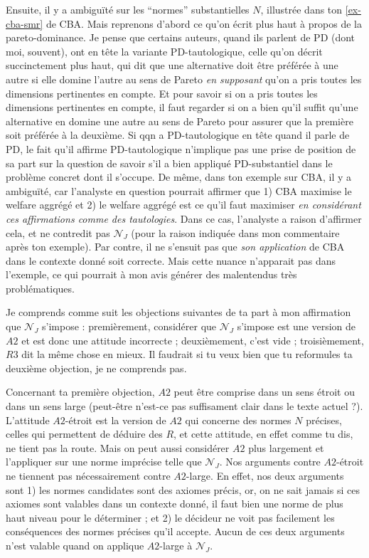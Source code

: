 \documentclass[preprint, french, english, 11pt, authoryear]{elsarticle}%
\newcommand{\fadv}{\mathscr{N}_J}%
\begin{document}
Ensuite, il y a ambiguïté sur les “normes” substantielles $N$, illustrée dans ton \cref{ex-cba-smr} de CBA. Mais reprenons d’abord ce qu’on écrit plus haut à propos de la pareto-dominance. Je pense que certains auteurs, quand ils parlent de PD (dont moi, souvent), ont en tête la variante PD-tautologique, celle qu’on décrit succinctement plus haut, qui dit que une alternative doit être préférée à une autre si elle domine l’autre au sens de Pareto \emph{en supposant} qu’on a pris toutes les dimensions pertinentes en compte. Et pour savoir si on a pris toutes les dimensions pertinentes en compte, il faut regarder si on a bien qu’il suffit qu’une alternative en domine une autre au sens de Pareto pour assurer que la première soit préférée à la deuxième. Si qqn a PD-tautologique en tête quand il parle de PD, le fait qu’il affirme PD-tautologique n’implique pas une prise de position de sa part sur la question de savoir s’il a bien appliqué PD-substantiel dans le problème concret dont il s’occupe. De même, dans ton exemple sur CBA, il y a ambiguïté, car l’analyste en question pourrait affirmer que 1) CBA maximise le welfare aggrégé et 2) le welfare aggrégé est ce qu’il faut maximiser \emph{en considérant ces affirmations comme des tautologies}. Dans ce cas, l’analyste a raison d’affirmer cela, et ne contredit pas $\fadv$ (pour la raison indiquée dans mon commentaire après ton exemple). Par contre, il ne s’ensuit pas que \emph{son application} de CBA dans le contexte donné soit correcte. Mais cette nuance n’apparait pas dans l’exemple, ce qui pourrait à mon avis générer des malentendus très problématiques.

Je comprends comme suit les objections suivantes de ta part à mon affirmation que $\fadv$ s’impose : premièrement, considérer que $\fadv$ s’impose est une version de $A2$ et est donc une attitude incorrecte ; deuxièmement, c’est vide ; troisièmement, $R3$ dit la même chose en mieux. Il faudrait si tu veux bien que tu reformules ta deuxième objection, je ne comprends pas.

Concernant ta première objection, $A2$ peut être comprise dans un sens étroit ou dans un sens large (peut-être n’est-ce pas suffisament clair dans le texte actuel ?). L’attitude $A2$-étroit est la version de $A2$ qui concerne des normes $N$ précises, celles qui permettent de déduire des $R$, et cette attitude, en effet comme tu dis, ne tient pas la route. Mais on peut aussi considérer $A2$ plus largement et l’appliquer sur une norme imprécise telle que $\fadv$. Nos arguments contre $A2$-étroit ne tiennent pas nécessairement contre $A2$-large. En effet, nos deux arguments sont 1) les normes candidates sont des axiomes précis, or, on ne sait jamais si ces axiomes sont valables dans un contexte donné, il faut bien une norme de plus haut niveau pour le déterminer ; et 2) le décideur ne voit pas facilement les conséquences des normes précises qu’il accepte. Aucun de ces deux arguments n’est valable quand on applique $A2$-large à $\fadv$.
\end{document}
